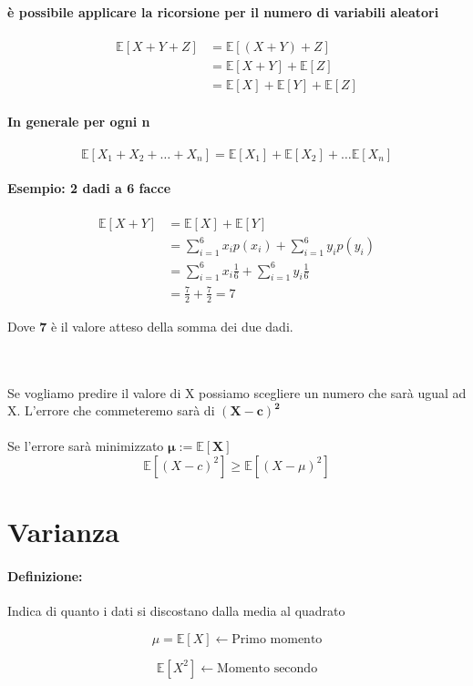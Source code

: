 \documentclass[]{article}
\newcommand{\ev}{\mathbb{E}[X]}
\renewcommand{\ev}[1]{\mathbb{E}[#1]}
\newcommand{\definizione}{\paragraph{Definizione:}}
\begin{document}
    \paragraph{è possibile applicare la ricorsione per il numero di variabili aleatori}
    \begin{equation*}
        \begin{split}
            \ev{X + Y + Z} &= \ev{(X + Y) + Z} \\
            & = \ev{X + Y} + \ev{Z} \\
            & = \ev{X} + \ev{Y} + \ev{Z}
        \end{split}
    \end{equation*}
    \paragraph{In generale per ogni n}
    \[ \ev{X_1 + X_2 + \ldots + X_n} = \ev{X_1} + \ev{X_2} + \ldots \ev{X_n} \]

    \paragraph{Esempio: 2 dadi a 6 facce}
    \begin{equation*}
      \begin{split}
        \ev{X + Y} & = \ev{X} + \ev{Y} \\
        & = \sum_{i = 1}^{6} x_i p(x_i) + \sum_{i = 1}^{6} y_i p(y_i) \\
        & = \sum_{i = 1}^{6} x_i \frac{1}{6} + \sum_{i = 1}^{6} y_i \frac{1}{6} \\
        & = \frac{7}{2} + \frac{7}{2} = 7 
      \end{split}  
    \end{equation*}
    \centerline{Dove \textbf{7} è il valore atteso della somma dei due dadi.} \\ \\
    Se vogliamo predire il valore di X possiamo scegliere un numero che sarà ugual ad X.
    L'errore che commeteremo sarà di $\boldsymbol{(X - c)^2}$ \\ \\
    Se \boldsymbol{$c = \ev{X}$} l'errore sarà minimizzato $\boldsymbol{\mu := \ev{X}}$
    \[ \ev{(X - c)^2} \geq \ev{(X - \mu)^2}\]

    \section{Varianza}
    \definizione Indica di quanto i dati si discostano dalla media al quadrato \\
    \begin{minipage}{0.45\textwidth}
        \[ \mu = \ev{X} \leftarrow \text{Primo momento}\]
    \end{minipage}
    \begin{minipage}{0.45\textwidth}
        \[ \ev{X^2} \leftarrow \text{Momento secondo}\]
    \end{minipage}
\end{document}
